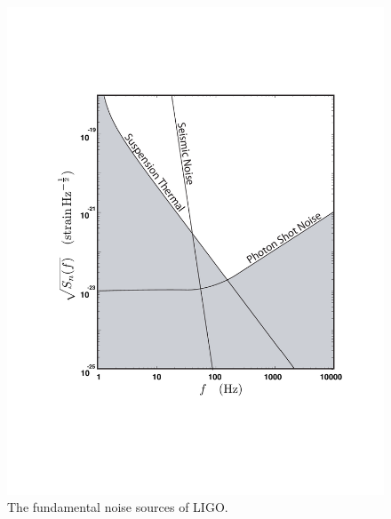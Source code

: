 \begin{figure}[p]
\label{f:design_noisecurve}
\begin{center}
\includegraphics[width=\linewidth]{figures/inspiral/ligonoise}
\end{center}
\caption[Fundamental Noise Sources of Initial LIGO]{%
The fundamental noise sources of LIGO.
}
\end{figure}


